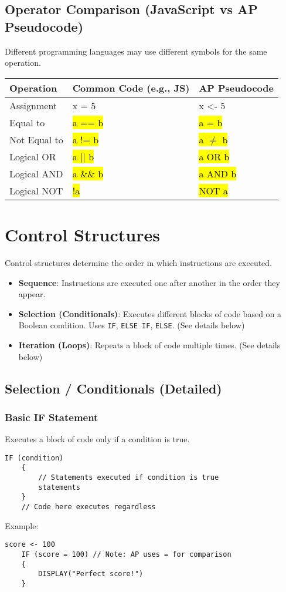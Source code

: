 \documentclass[11pt,oneside]{book}
\newcommand{\hlc}[2][hlyellow]{\sethlcolor{#1}\hl{#2}}
\begin{document}
\subsection*{Operator Comparison (JavaScript vs AP Pseudocode)}
Different programming languages may use different symbols for the same operation.

\begin{tabularx}{\textwidth}{l >{\ttfamily}l >{\ttfamily}l}
\toprule
\textbf{Operation} & \textbf{Common Code (e.g., JS)} & \textbf{AP Pseudocode} \\
\midrule
Assignment & x = 5 & x <- 5 \\
Equal to & \hlc[hlyellow]{a == b} & \hlc[hlyellow]{a = b} \\
Not Equal to & \hlc[hlyellow]{a != b} & \hlc[hlyellow]{a $\neq$ b} \\
Logical OR & \hlc[hlred]{a || b} & \hlc[hlred]{a OR b} \\
Logical AND & \hlc[hlred]{a \&\& b} & \hlc[hlred]{a AND b} \\
Logical NOT & \hlc[hlred]{!a} & \hlc[hlred]{NOT a} \\
\bottomrule
\end{tabularx}

\section{Control Structures}
\label{sec:control_structures}
Control structures determine the order in which instructions are executed.
\begin{itemize}
    \item \textbf{Sequence}: Instructions are executed one after another in the order they appear.
    \item \textbf{Selection (Conditionals)}: Executes different blocks of code based on a Boolean condition. Uses \texttt{IF}, \texttt{ELSE IF}, \texttt{ELSE}. (See details below)
    \item \textbf{Iteration (Loops)}: Repeats a block of code multiple times. (See details below)
\end{itemize}

\subsection*{Selection / Conditionals (Detailed)}

\subsubsection*{Basic IF Statement}
Executes a block of code only if a condition is true.
\begin{lstlisting}[language={}, label={lst:basic_if}, caption={AP Pseudocode: Basic IF}]
    IF (condition)
    {
        // Statements executed if condition is true
        statements
    }
    // Code here executes regardless
\end{lstlisting}
Example:
\begin{lstlisting}[language={}]
    score <- 100
    IF (score = 100) // Note: AP uses = for comparison
    {
        DISPLAY("Perfect score!")
    }
\end{lstlisting}
\end{document}

